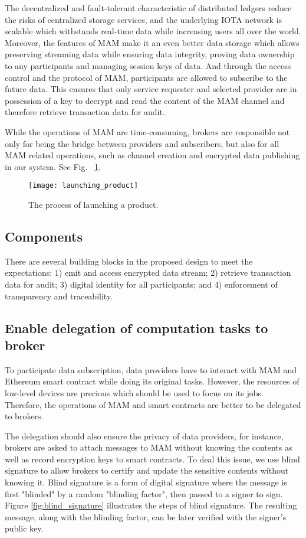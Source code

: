 The decentralized and fault-tolerant characteristic of distributed ledgers reduce the risks of centralized storage services, and the underlying IOTA network is scalable which withstands real-time data while increasing users all over the world. Moreover, the features of MAM make it an even better data storage which allows preserving streaming data while ensuring data integrity, proving data ownership to any participants and managing session keys of data. And through the access control and the protocol of MAM, participants are allowed to subscribe to the future data. This ensures that only service requester and selected provider are in possession of a key to decrypt and read the content of the MAM channel and therefore retrieve transaction data for audit.

While the operations of MAM are time-consuming, brokers are responsible not only for being the bridge between providers and subscribers, but also for all MAM related operations, such as channel creation and encrypted data publishing in our system. See Fig.~ \ref{fig:launching_product}.

\begin{figure}[!t]
    \centering
    \texttt{[image: launching\_product]}
    \caption{The process of launching a product.}
    \label{fig:launching_product}
\end{figure}


\subsection{Components}
There are several building blocks in the proposed design to meet the expectations: 1) emit and access encrypted data stream; 2) retrieve transaction data for audit; 3) digital identity for all participants; and 4) enforcement of transparency and traceability.

\subsection{Enable delegation of computation tasks to broker}
To participate data subscription, data providers have to interact with MAM and Ethereum smart contract while doing its original tasks. However, the resources of low-level devices are precious which should be used to focus on its jobs. Therefore, the operations of MAM and smart contracts are better to be delegated to brokers. 

The delegation should also ensure the privacy of data providers, for instance, brokers are asked to attach messages to MAM without knowing the contents as well as record encryption keys to smart contracts. To deal this issue, we use blind signature\cite{blindSig} to allow brokers to certify and update the sensitive contents without knowing it. Blind signature is a form of digital signature where the message is first "blinded" by a random "blinding factor", then passed to a signer to sign. Figure \ref{fig:blind_signature} illustrates the steps of blind signature. The resulting message, along with the blinding factor, can be later verified with the signer's public key. 

